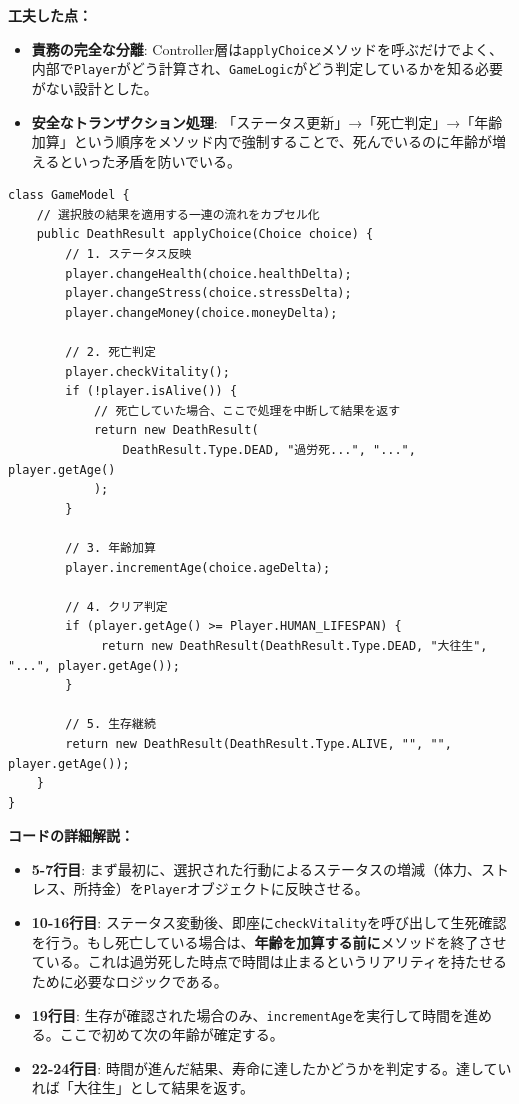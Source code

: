 \documentclass[a4paper,11pt]{jsarticle}
\begin{document}
\textbf{工夫した点：}
\begin{itemize}
    \item \textbf{責務の完全な分離}: 
    Controller層は\texttt{applyChoice}メソッドを呼ぶだけでよく、内部で\texttt{Player}がどう計算され、\texttt{GameLogic}がどう判定しているかを知る必要がない設計とした。
    \item \textbf{安全なトランザクション処理}: 
    「ステータス更新」→「死亡判定」→「年齢加算」という順序をメソッド内で強制することで、死んでいるのに年齢が増えるといった矛盾を防いでいる。
\end{itemize}

\begin{lstlisting}[caption=GameModel.java, label=code:gamemodel_detail]
class GameModel {
    // 選択肢の結果を適用する一連の流れをカプセル化
    public DeathResult applyChoice(Choice choice) {
        // 1. ステータス反映
        player.changeHealth(choice.healthDelta);
        player.changeStress(choice.stressDelta);
        player.changeMoney(choice.moneyDelta);
        
        // 2. 死亡判定 
        player.checkVitality();
        if (!player.isAlive()) {
            // 死亡していた場合、ここで処理を中断して結果を返す
            return new DeathResult(
                DeathResult.Type.DEAD, "過労死...", "...", player.getAge()
            );
        }

        // 3. 年齢加算 
        player.incrementAge(choice.ageDelta);
        
        // 4. クリア判定 
        if (player.getAge() >= Player.HUMAN_LIFESPAN) {
             return new DeathResult(DeathResult.Type.DEAD, "大往生", "...", player.getAge());
        }

        // 5. 生存継続
        return new DeathResult(DeathResult.Type.ALIVE, "", "", player.getAge());
    }
}
\end{lstlisting}

\textbf{コードの詳細解説：}
\begin{itemize}
    \item \textbf{5-7行目}: まず最初に、選択された行動によるステータスの増減（体力、ストレス、所持金）を\texttt{Player}オブジェクトに反映させる。
    \item \textbf{10-16行目}: ステータス変動後、即座に\texttt{checkVitality}を呼び出して生死確認を行う。もし死亡している場合は、\textbf{年齢を加算する前に}メソッドを終了させている。これは過労死した時点で時間は止まるというリアリティを持たせるために必要なロジックである。
    \item \textbf{19行目}: 生存が確認された場合のみ、\texttt{incrementAge}を実行して時間を進める。ここで初めて次の年齢が確定する。
    \item \textbf{22-24行目}: 時間が進んだ結果、寿命に達したかどうかを判定する。達していれば「大往生」として結果を返す。
\end{itemize}
\end{document}
